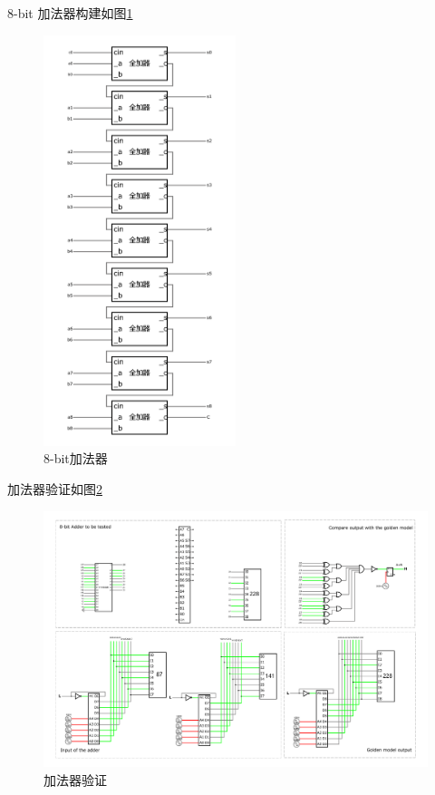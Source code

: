 \documentclass{article}
\begin{document}
8-bit 加法器构建如图\ref{fig:8-bit}

\begin{figure}[htbp]
    \centering
    \includegraphics[width=0.5\textwidth]{8-bit加法器.pdf}
    \caption{8-bit加法器}
    \label{fig:8-bit}
\end{figure}

加法器验证如图\ref{fig:jiafaqiyanzheng}

\begin{figure}[htbp]
    \centering
    \includegraphics[width=1\textwidth]{加法器验证.pdf}
    \caption{加法器验证}
    \label{fig:jiafaqiyanzheng}
\end{figure}
\end{document}
